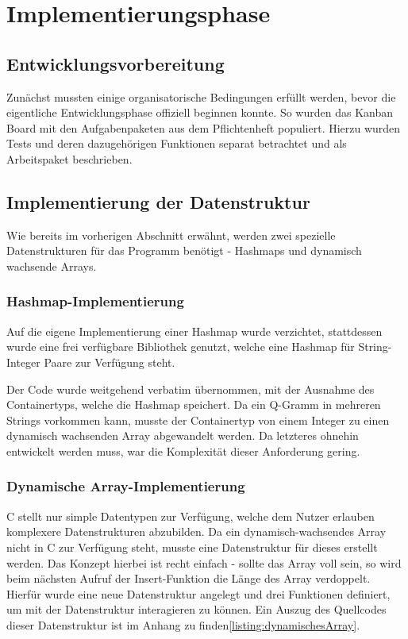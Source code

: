 \section{Implementierungsphase}

\subsection{Entwicklungsvorbereitung}
Zunächst mussten einige organisatorische Bedingungen erfüllt werden, bevor die eigentliche Entwicklungsphase offiziell beginnen konnte. So wurden das Kanban Board mit den
Aufgabenpaketen aus dem Pflichtenheft populiert. Hierzu wurden Tests und deren
dazugehörigen Funktionen separat betrachtet und als Arbeitspaket beschrieben.

\subsection{Implementierung der Datenstruktur}
Wie bereits im vorherigen Abschnitt erwähnt, werden zwei spezielle Datenstrukturen für das Programm benötigt - Hashmaps und dynamisch wachsende Arrays.

\subsubsection{Hashmap-Implementierung}


Auf die eigene Implementierung einer Hashmap wurde verzichtet, stattdessen wurde
eine frei verfügbare Bibliothek genutzt, welche eine Hashmap für
String-Integer Paare zur Verfügung steht.

Der Code wurde weitgehend verbatim übernommen, mit der Ausnahme des
Containertyps, welche die Hashmap speichert. Da ein Q-Gramm in mehreren Strings
vorkommen kann, musste der Containertyp von einem Integer zu einen dynamisch
wachsenden Array abgewandelt werden. Da letzteres ohnehin entwickelt werden muss,
war die Komplexität dieser Anforderung gering.

\subsubsection{Dynamische Array-Implementierung}
C stellt nur simple Datentypen zur Verfügung, welche dem Nutzer erlauben komplexere Datenstrukturen abzubilden. Da ein dynamisch-wachsendes
Array nicht in C zur Verfügung steht, musste eine Datenstruktur für dieses erstellt werden.
Das Konzept hierbei ist recht einfach - sollte das Array voll sein, so wird beim
nächsten Aufruf der Insert-Funktion die Länge des Array verdoppelt. Hierfür wurde eine neue Datenstruktur angelegt und drei Funktionen definiert, um mit der Datenstruktur interagieren zu können. Ein Auszug des Quellcodes dieser Datenstruktur ist im Anhang zu finden\ref{listing:dynamischesArray}.\par

\clearpage